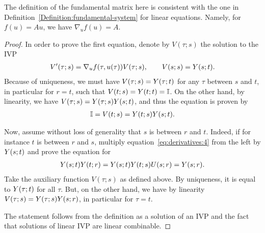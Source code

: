 \begin{remark}
  The definition of the fundamental matrix here is consistent with the
  one in Definition~\ref{Definition:fundamental-system} for linear
  equations. Namely, for $f(u) = Au$, we have $\nabla_u f(u) = A$.
\end{remark}



\begin{proof}
  In order to prove the first equation, denote by $V(\tau;s)$ the
  solution to the IVP
  \begin{gather*}
    V'(\tau;s) = \nabla_u f(\tau,u(\tau)) V(\tau;s),
    \qquad V(s;s) = \fundamental(s;t).
  \end{gather*}
  Because of uniqueness, we must have
  $V(\tau;s) = \fundamental(\tau;t)$ for any $\tau$ between $s$ and
  $t$, in particular for $r=t$, such that $V(t;s) = \fundamental(t;t) = \identity$. On the
  other hand, by linearity, we have
  $V(\tau;s) = \fundamental(\tau;s)\fundamental(s;t)$, and thus the
  equation is proven by
  \begin{gather*}
    \identity = V(t;s) = \fundamental(t;s)\fundamental(s;t).
  \end{gather*}

  Now, assume without loss of generality that $s$ is between $r$ and
  $t$. Indeed, if for instance $t$ is between $r$ and $s$, multiply
  equation~\eqref{eq:derivatives:4} from the left by $\fundamental(s;t)$ and
  prove the equation for
  \begin{gather*}
    \fundamental(s;t)\fundamental(t;r)
    = \fundamental(s;t)\fundamental(t;s)U(s;r)
    = \fundamental(s;r).
  \end{gather*}
  Take the auxiliary function $V(\tau;s)$ as defined above. By
  uniqueness, it is equal to $\fundamental(\tau;t)$ for all $\tau$. But, on the
  other hand, we have by linearity $V(\tau;s) = \fundamental(\tau;s)\fundamental(s;r)$, in
  particular for $\tau=t$.

  The statement follows from the definition as a solution of an IVP
  and the fact that solutions of linear IVP are linear combinable.
\end{proof}



